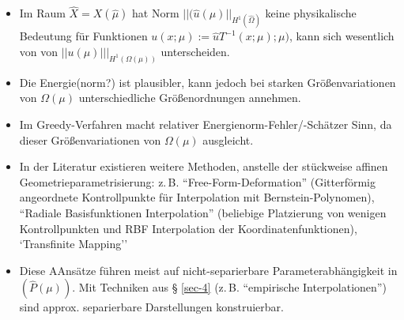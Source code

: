 \begin{bem}[Fehlermaße] \beginwithlistbem
	\begin{itemize}
		\item Im Raum $\hat{X} = X(\hat{\mu})$ hat Norm $|| (\hat{u}(\mu)||_{H^1(\hat{\Omega})}$ keine physikalische Bedeutung für Funktionen $u(x;\mu) := \hat{u} T^{-1}(x;\mu);\mu)$, kann sich wesentlich von von $||u(\mu)|||_{H^1(\Omega(\mu))}$ unterscheiden.
		\item Die Energie(norm?) ist plausibler, kann jedoch bei starken Größenvariationen von $\Omega(\mu)$ unterschiedliche Größenordnungen annehmen.
		\item Im Greedy-Verfahren macht relativer  Energienorm-Fehler/-Schätzer Sinn, da dieser Größenvariationen von $\Omega (\mu)$ ausgleicht.
	\end{itemize}
\end{bem}

\begin{bem} \beginwithlistbem
	\begin{itemize}
		\item In der Literatur existieren weitere Methoden, anstelle der stückweise affinen Geometrieparametrisierung: z.\,B. ``Free-Form-Deformation'' (Gitterförmig angeordnete Kontrollpunkte für Interpolation mit Bernstein-Polynomen), ``Radiale Basisfunktionen Interpolation'' (beliebige Platzierung von wenigen Kontrollpunkten und RBF Interpolation der Koordinatenfunktionen), `Transfinite Mapping''
		\item Diese AAnsätze führen meist auf nicht-separierbare Parameterabhängigkeit in $(\hat{P}(\mu))$. Mit Techniken aus § \ref{sec-4} (z.\,B. ``empirische Interpolationen'') sind approx. separierbare Darstellungen konstruierbar.
	\end{itemize}
\end{bem}
